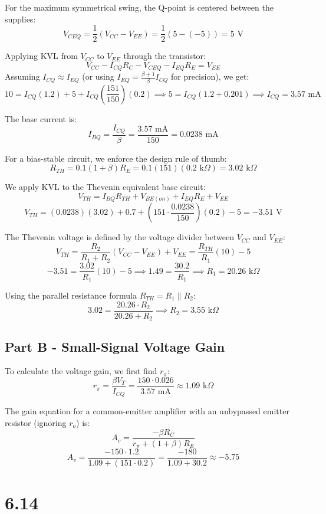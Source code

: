 \documentclass{article}
\begin{document}
For the maximum symmetrical swing, the Q-point is centered between the supplies:
$$ V_{CEQ} = \frac{1}{2}(V_{CC} - V_{EE}) = \frac{1}{2}(5 - (-5)) = 5 \text{ V} $$

Applying KVL from $V_{CC}$ to $V_{EE}$ through the transistor:
$$ V_{CC} - I_{CQ} R_C - V_{CEQ} - I_{EQ} R_E = V_{EE} $$
Assuming $I_{CQ} \approx I_{EQ}$ (or using $I_{EQ} = \frac{\beta+1}{\beta} I_{CQ}$ for precision), we get:
$$ 10 = I_{CQ}(1.2) + 5 + I_{CQ} \left(\frac{151}{150}\right) (0.2) \implies 5 = I_{CQ}(1.2 + 0.201) \implies I_{CQ} = 3.57 \text{ mA} $$

The base current is:
$$ I_{BQ} = \frac{I_{CQ}}{\beta} = \frac{3.57 \text{ mA}}{150} = 0.0238 \text{ mA} $$

For a bias-stable circuit, we enforce the design rule of thumb:
$$ R_{TH} = 0.1(1 + \beta)R_E = 0.1(151)(0.2 \text{ k}\Omega) = 3.02 \text{ k}\Omega $$

We apply KVL to the Thevenin equivalent base circuit:
$$ V_{TH} = I_{BQ} R_{TH} + V_{BE(on)} + I_{EQ} R_E + V_{EE} $$
$$ V_{TH} = (0.0238)(3.02) + 0.7 + (151 \cdot \frac{0.0238}{150})(0.2) - 5 = -3.51 \text{ V} $$

The Thevenin voltage is defined by the voltage divider between $V_{CC}$ and $V_{EE}$:
$$ V_{TH} = \frac{R_2}{R_1 + R_2}(V_{CC} - V_{EE}) + V_{EE} = \frac{R_{TH}}{R_1}(10) - 5 $$
$$ -3.51 = \frac{3.02}{R_1}(10) - 5 \implies 1.49 = \frac{30.2}{R_1} \implies R_1 = 20.26 \text{ k}\Omega $$

Using the parallel resistance formula $R_{TH} = R_1 \parallel R_2$:
$$ 3.02 = \frac{20.26 \cdot R_2}{20.26 + R_2} \implies R_2 = 3.55 \text{ k}\Omega $$

\subsection{Part B - Small-Signal Voltage Gain}
To calculate the voltage gain, we first find $r_\pi$:
$$ r_\pi = \frac{\beta V_T}{I_{CQ}} = \frac{150 \cdot 0.026}{3.57 \text{ mA}} \approx 1.09 \text{ k}\Omega $$

The gain equation for a common-emitter amplifier with an unbypassed emitter resistor (ignoring $r_o$) is:
$$ A_v = \frac{-\beta R_C}{r_\pi + (1 + \beta)R_E} $$
$$ A_v = \frac{-150 \cdot 1.2}{1.09 + (151 \cdot 0.2)} = \frac{-180}{1.09 + 30.2} \approx -5.75 $$

\pagebreak
\section{6.14}
\end{document}
